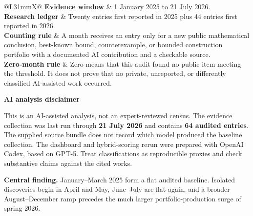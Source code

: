 \documentclass[11pt,a4paper]{article}
\newcommand{\metric}[2]{%
  \textbf{\color{Ink}#1} & \color{Slate}#2\\[1.6mm]
}
\begin{document}
\begin{titlepage}
\begin{minipage}{\paperwidth}
\begin{minipage}{167mm}
  \begin{minipage}[t]{103mm}
    {\fontsize{9}{12.5}\selectfont
    \begin{tabularx}{\linewidth}{@{}L{31mm}X@{}}
      \metric{Evidence window}{1 January 2025 to 21 July 2026.}
      \metric{Research ledger}{Twenty entries first reported in 2025 plus 44 entries first reported in 2026.}
      \metric{Counting rule}{A month receives an entry only for a new public mathematical conclusion, best-known bound, counterexample, or bounded construction portfolio with a documented AI contribution and a checkable source.}
      \metric{Zero-month rule}{Zero means that this audit found no public item meeting the threshold. It does not prove that no private, unreported, or differently classified AI-assisted work occurred.}
    \end{tabularx}}
  \end{minipage}\hfill
  \begin{minipage}[t]{52mm}
    \vspace{1mm}
    \colorbox{PaleBlue}{\parbox{45mm}{%
      \vspace{4mm}\hspace{3mm}%
      \begin{minipage}{37mm}
      {\fontsize{8.6}{12}\selectfont\color{Ink}
      \textbf{AI analysis disclaimer}\par\vspace{2mm}
      \color{Slate}This is an AI-assisted analysis, not an expert-reviewed census. The evidence collection was last run through \textbf{21 July 2026} and contains \textbf{64 audited entries}. The supplied source bundle does not record which model produced the baseline collection. The dashboard and hybrid-scoring rerun were prepared with OpenAI Codex, based on GPT-5. Treat classifications as reproducible proxies and check substantive claims against the cited works.}
      \end{minipage}\hspace{3mm}\vspace{4mm}}}
  \end{minipage}

  \vspace{8mm}
  \colorbox{PaleGray}{\parbox{\dimexpr\linewidth-8mm\relax}{%
    \vspace{4mm}\hspace{4mm}\begin{minipage}{\dimexpr\linewidth-16mm\relax}
    {\fontsize{9.5}{13.5}\selectfont\color{Slate}%
    \textbf{\color{Ink}Central finding.} January--March 2025 form a flat audited baseline. Isolated discoveries begin in April and May, June--July are flat again, and a broader August--December ramp precedes the much larger portfolio-production surge of spring 2026.}
    \end{minipage}\hspace{4mm}\vspace{4mm}}}


\end{minipage}
\end{minipage}
\end{titlepage}
\end{document}
